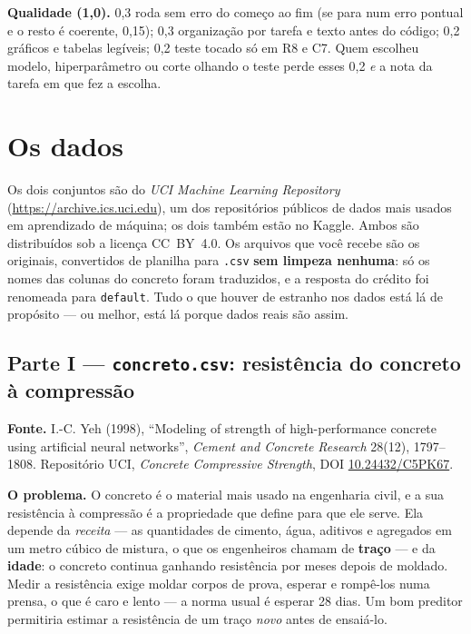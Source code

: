 \documentclass[11pt,a4paper]{article}
\newcommand{\cod}[1]{\texttt{#1}}
\begin{document}
\begin{criterio}
\textbf{Qualidade (1,0).} 0,3 roda sem erro do começo ao fim (se para num erro
pontual e o resto é coerente, 0,15); 0,3 organização por tarefa e
texto antes do código; 0,2 gráficos e tabelas legíveis; 0,2 teste tocado só em R8 e
C7. Quem escolheu modelo, hiperparâmetro ou corte olhando o teste perde esses 0,2
\emph{e} a nota da tarefa em que fez a escolha.
\end{criterio}

\section{Os dados}
Os dois conjuntos são do \emph{UCI Machine Learning Repository}
(\url{https://archive.ics.uci.edu}), um dos repositórios públicos de dados mais
usados em aprendizado de máquina; os dois também estão no Kaggle. Ambos são
distribuídos sob a licença CC~BY~4.0. Os arquivos que você recebe são os originais,
convertidos de planilha para \cod{.csv} \textbf{sem limpeza nenhuma}: só os nomes das
colunas do concreto foram traduzidos, e a resposta do crédito foi renomeada para
\cod{default}. Tudo o que houver de estranho nos dados está lá de propósito --- ou
melhor, está lá porque dados reais são assim.

\subsection{Parte I --- \texttt{concreto.csv}: resistência do concreto à compressão}

\noindent\textbf{Fonte.} I.-C. Yeh (1998), ``Modeling of strength of
high-performance concrete using artificial neural networks'', \emph{Cement and
Concrete Research} 28(12), 1797--1808. Repositório UCI, \emph{Concrete Compressive
Strength}, DOI \href{https://doi.org/10.24432/C5PK67}{10.24432/C5PK67}.

\medskip\noindent\textbf{O problema.} O concreto é o material mais usado na
engenharia civil, e a sua resistência à compressão é a propriedade que define para
que ele serve. Ela depende da \emph{receita} --- as quantidades de cimento, água,
aditivos e agregados em um metro cúbico de mistura, o que os engenheiros chamam de
\textbf{traço} --- e da \textbf{idade}: o concreto continua ganhando resistência por
meses depois de moldado. Medir a resistência exige moldar corpos de prova, esperar e
rompê-los numa prensa, o que é caro e lento --- a norma usual é esperar 28 dias. Um
bom preditor permitiria estimar a resistência de um traço \emph{novo} antes de
ensaiá-lo.
\end{document}
